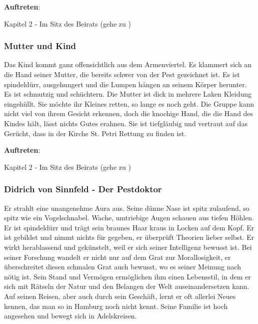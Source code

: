 
\textbf{Auftreten}:

Kapitel 2 - Im Sitz des Beirats (gehe zu \blue{\ref{militär}})

\subsubsection*{Mutter und Kind}
\label{MutterKind}

Das Kind kommt ganz offensichtlich aus dem Armenviertel. Es klammert sich an die Hand seiner Mutter, die bereits schwer von der Pest gezeichnet ist. Es ist spindeldürr, ausgehungert und die Lumpen hängen an seinem Körper herunter. Es ist schmutzig und schüchtern. Die Mutter ist dick in mehrere Laken Kleidung eingehüllt. Sie möchte ihr Kleines retten, so lange es noch geht. Die Gruppe kann nicht viel von ihrem Gesicht erkennen, doch die knochige Hand, die die Hand des Kindes hält, lässt nichts Gutes erahnen. Sie ist tiefgläubig und vertraut auf das Gerücht, dass in der Kirche St. Petri Rettung zu finden ist.

\textbf{Auftreten}:

Kapitel 2 - Im Sitz des Beirats (gehe zu \blue{\ref{kind}})

\subsubsection*{Didrich von Sinnfeld - Der Pestdoktor}
\label{Didrich}

Er strahlt eine unangenehme Aura aus. Seine dünne Nase ist spitz zulaufend, so spitz wie ein Vogelschnabel. Wache, umtriebige Augen schauen aus tiefen Höhlen. Er ist spindeldürr und trägt sein braunes Haar kraus in Locken auf dem Kopf. Er ist gebildet und nimmt nichts für gegeben, er überprüft Theorien lieber selbst. Er wirkt herablassend und gekünstelt, weil er sich seiner Intelligenz bewusst ist. Bei seiner Forschung wandelt er nicht nur auf dem Grat zur Morallosigkeit, er überschreitet diesen schmalen Grat auch bewusst, wo es seiner Meinung nach nötig ist. Sein Stand und Vermögen ermöglichen ihm einen Lebensstil, in dem er sich mit Rätseln der Natur und den Belangen der Welt auseinandersetzen kann. Auf seinen Reisen, aber auch durch sein Geschäft, lernt er oft allerlei Neues kennen, das man so in Hamburg noch nicht kennt. Seine Familie ist hoch angesehen und bewegt sich in Adelskreisen.

